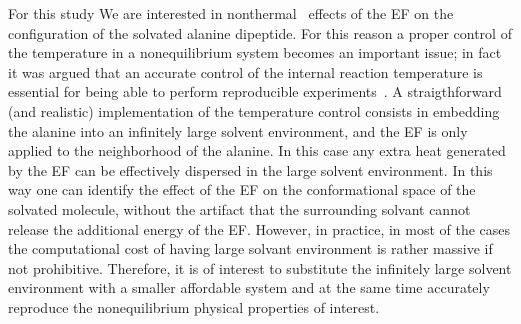 \documentclass[a4paper,preprint,unsortedaddress,onecolumn]{revtex4-1}
\begin{document}
For this study We are interested in 
nonthermal~\cite{delaHoz2005microwaves} effects of the EF
on the configuration of the solvated alanine dipeptide.
For this reason a proper control of the temperature in a nonequilibrium system
becomes an important issue; in fact it was argued that  an
accurate control of the internal reaction temperature is essential for being able to
perform reproducible experiments~\cite{damm2012can}.
A straigthforward (and realistic) implementation of the temperature control consists in 
embedding the alanine into an infinitely large solvent environment, and 
the EF is only applied to the neighborhood of the alanine. In this case
any extra heat generated by the EF can be effectively
dispersed in the large solvent environment.
In this way one can identify the effect of the EF on the conformational space of the solvated molecule,
without the artifact that the surrounding solvant cannot release the additional energy of the EF.
However, in practice, in most of the cases the computational cost of having large solvant environment is rather massive if not prohibitive.
Therefore, it is of interest to substitute the infinitely large
solvent environment with a smaller affordable system and at the same time accurately reproduce the nonequilibrium
physical properties of interest.
\end{document}

